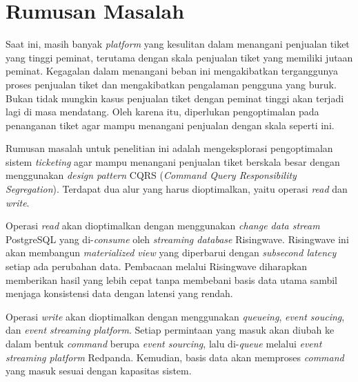 \section{Rumusan Masalah}

Saat ini, masih banyak \textit{platform} yang kesulitan dalam menangani penjualan tiket yang tinggi peminat, terutama dengan skala penjualan tiket yang memiliki jutaan peminat. Kegagalan dalam menangani beban ini mengakibatkan terganggunya proses penjualan tiket dan mengakibatkan pengalaman pengguna yang buruk. Bukan tidak mungkin kasus penjualan tiket dengan peminat tinggi akan terjadi lagi di masa mendatang. Oleh karena itu, diperlukan pengoptimalan pada penanganan tiket agar mampu menangani penjualan dengan skala seperti ini.

Rumusan masalah untuk penelitian ini adalah mengeksplorasi pengoptimalan sistem \textit{ticketing} agar mampu menangani penjualan tiket berskala besar dengan menggunakan \textit{design pattern} CQRS (\textit{Command Query Responsibility Segregation}). Terdapat dua alur yang harus dioptimalkan, yaitu operasi \textit{read} dan \textit{write}.

Operasi \textit{read} akan dioptimalkan dengan menggunakan \textit{change data stream} PostgreSQL yang di-\textit{consume} oleh \textit{streaming database} Risingwave. Risingwave ini akan membangun \textit{materialized view} yang diperbarui dengan \textit{subsecond latency} setiap ada perubahan data. Pembacaan melalui Risingwave diharapkan memberikan hasil yang lebih cepat tanpa membebani basis data utama sambil menjaga konsistensi data dengan latensi yang rendah.

Operasi \textit{write} akan dioptimalkan dengan menggunakan \textit{queueing}, \textit{event soucing}, dan \textit{event streaming platform}. Setiap permintaan yang masuk akan diubah ke dalam bentuk \textit{command} berupa \textit{event sourcing}, lalu di-\textit{queue} melalui \textit{event streaming platform} Redpanda. Kemudian, basis data akan memproses \textit{command} yang masuk sesuai dengan kapasitas sistem.

